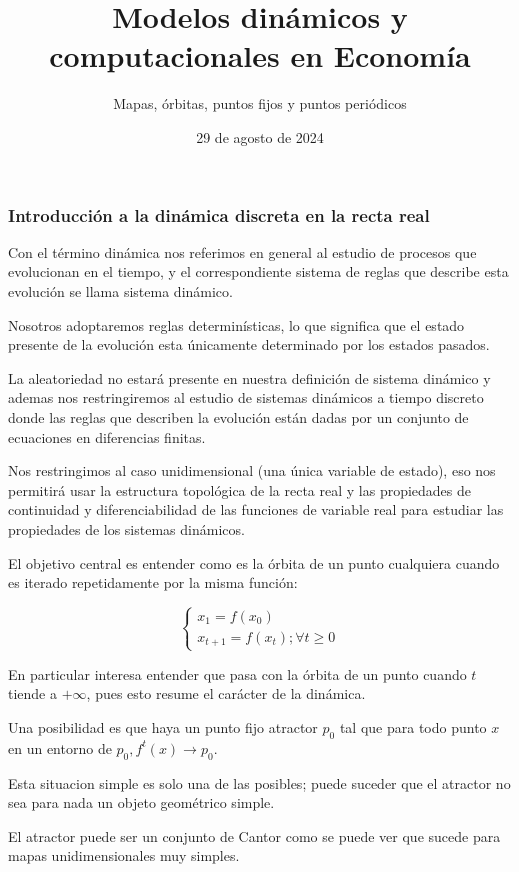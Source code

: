 \documentclass[11pt]{beamer}
\begin{document}
	\title{Modelos dinámicos y computacionales en Economía}
	\subtitle{Mapas, órbitas, puntos fijos y puntos periódicos}
	\date{29 de agosto de 2024}
	\frame[plain]{\maketitle}

\begin{frame}[allowframebreaks]
\frametitle{Introducción a la dinámica discreta en la recta real}
Con el término dinámica nos referimos en general al estudio de procesos que evolucionan en el tiempo, y el correspondiente sistema de reglas que describe esta evolución se llama sistema dinámico.

Nosotros adoptaremos reglas determinísticas, lo que significa que el estado presente de la evolución esta únicamente determinado por los estados pasados.

La aleatoriedad no estará presente en nuestra definición de sistema dinámico y ademas nos restringiremos al estudio de sistemas dinámicos a tiempo discreto donde las reglas que describen la evolución están dadas por un conjunto de ecuaciones en diferencias finitas.

Nos restringimos al caso unidimensional (una única variable de estado), eso nos permitirá usar la estructura topológica de la recta real y las propiedades de continuidad y diferenciabilidad de las funciones de variable real para estudiar las propiedades de los sistemas dinámicos.

El objetivo central es entender como es la órbita de un punto cualquiera cuando es iterado repetidamente por la misma función:

$$
\left\{\begin{array}{c}
x_{1}=f\left(x_{0}\right) \\
x_{t+1}=f\left(x_{t}\right) ; \forall t \geq 0
\end{array}\right.
$$

En particular interesa entender que pasa con la órbita de un punto cuando $t$ tiende a $+\infty$, pues esto resume el carácter de la dinámica.

Una posibilidad es que haya un punto fijo atractor $p_{0}$ tal que para todo punto $x$ en un entorno de $p_{0}, f^{t}(x) \rightarrow p_{0}$.

Esta situacion simple es solo una de las posibles; puede suceder que el atractor no sea para nada un objeto geométrico simple.

El atractor puede ser un conjunto de Cantor como se puede ver que sucede para mapas unidimensionales muy simples.
\end{frame}
\end{document}
